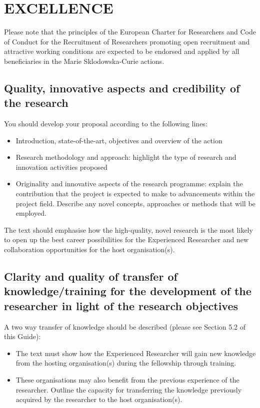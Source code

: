 \section{EXCELLENCE}
\label{sec:excellence}

Please note that the principles of the European Charter for Researchers and Code of Conduct for the Recruitment of Researchers promoting open recruitment and attractive working conditions are expected to be endorsed and applied by all beneficiaries in the Marie Sklodowska-Curie actions.

\subsection{Quality, innovative aspects and credibility of the research}
\label{sec:quality}

You should develop your proposal according to the following lines:
\begin{itemize}
\item Introduction, state-of-the-art, objectives and overview of the action
\item Research methodology and approach: highlight the type of research and innovation activities proposed
\item Originality and innovative aspects of the research programme: explain the contribution that the project is expected to make to advancements within the project field. Describe any novel concepts, approaches or methods that will be employed.
\end{itemize}
The text should emphasise how the high-quality, novel research is the most likely to open up the best career possibilities for the Experienced Researcher and new collaboration opportunities for the host organisation(s).

\subsection{Clarity and quality of transfer of knowledge/training for the development of the researcher in light of the research objectives}
\label{sec:transfer}

A two way transfer of knowledge should be described (please see Section 5.2 of this Guide):
\begin{itemize}
\item The text must show how the Experienced Researcher will gain new knowledge from the hosting organisation(s) during the fellowship through training.
\item These organisations may also benefit from the previous experience of the researcher. Outline the capacity for transferring the knowledge previously acquired by the researcher to the host organisation(s).
\end{itemize}

